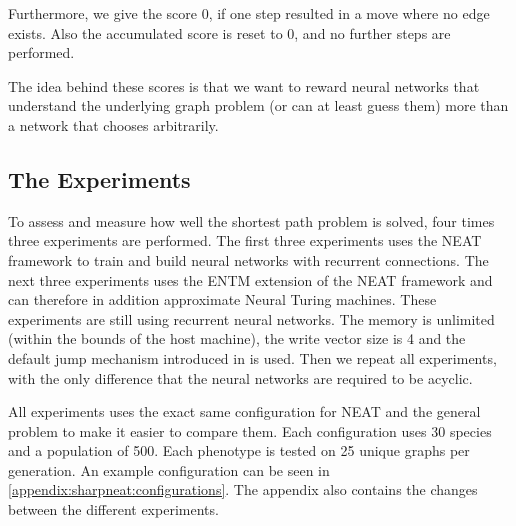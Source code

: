 \noindent Furthermore, we give the score 0, if one step resulted in a move where no edge exists. Also the accumulated score is reset to 0, and no further steps are performed.

\newpar The idea behind these scores is that we want to reward neural networks that understand the underlying graph problem (or can at least guess them) more than a network that chooses arbitrarily.

\subsection{The Experiments}
To assess and measure how well the shortest path problem is solved, four times three experiments are performed. The first three experiments uses the NEAT framework to train and build neural networks with recurrent connections. The next three experiments uses the ENTM extension of the NEAT framework and can therefore in addition approximate Neural Turing machines. These experiments are still using recurrent neural networks. The memory is unlimited (within the bounds of the host machine), the write vector size is 4 and the default jump mechanism introduced in \cite{luders2017continual} is used. Then we repeat all experiments, with the only difference that the neural networks are required to be acyclic.

\newpar All experiments uses the exact same configuration for NEAT and the general problem to make it easier to compare them. Each configuration uses 30 species and a population of 500. Each phenotype is tested on 25 unique graphs per generation. An example configuration can be seen in \autoref{appendix:sharpneat:configurations}. The appendix also contains the changes between the different experiments.